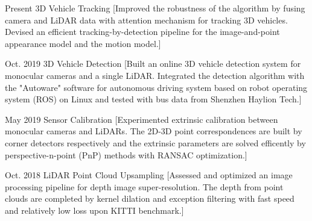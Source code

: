 \documentclass{resume}
\begin{document}
\begin{experiences}
  \experience%
    {Present}%
    {3D Vehicle Tracking}%
    [Improved the robustness of the algorithm by fusing camera and LiDAR data with attention mechanism for tracking 3D vehicles. Devised an efficient tracking-by-detection pipeline for the image-and-point appearance model and the motion model.]

\separator{0.5ex}

  \experience%
    {Oct. 2019}%
    {3D Vehicle Detection}%
    [Built an online 3D vehicle detection system for monocular cameras and a single LiDAR. Integrated the detection algorithm with the "Autoware" software for autonomous driving system based on robot operating system (ROS) on Linux and tested with bus data from Shenzhen Haylion Tech.] 

\separator{0.5ex}

  \experience%
    {May 2019}%
    {Sensor Calibration}%
    [Experimented extrinsic calibration between monocular cameras and LiDARs. The 2D-3D point correspondences are built by corner detectors respectively and the extrinsic parameters are solved efficently by perspective-n-point (PnP) methods with RANSAC optimization.]

\separator{0.5ex}

  \experience%
    {Oct. 2018}%
    {LiDAR Point Cloud Upsampling}%
    [Assessed and optimized an image processing pipeline for depth image super-resolution. The depth from point clouds are completed by kernel dilation and exception filtering with fast speed and relatively low loss upon KITTI benchmark.]   
    

\end{experiences}

\begin{competences}[12em]
\end{competences}
\end{document}
